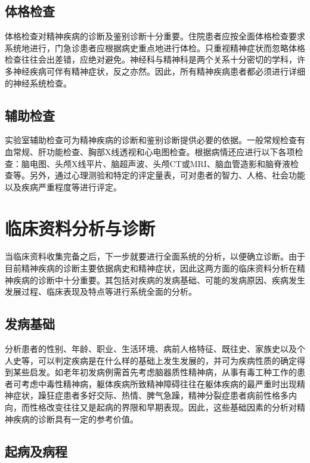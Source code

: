 \subsection{体格检查}

体格检查对精神疾病的诊断及鉴别诊断十分重要。住院患者应按全面体格检查要求系统地进行，门急诊患者应根据病史重点地进行体检。只重视精神症状而忽略体格检查往往会出差错，应绝对避免。神经科与精神科是两个关系十分密切的学科，许多神经疾病可伴有精神症状，反之亦然。因此，所有精神疾病患者都必须进行详细的神经系统检查。

\subsection{辅助检查}

实验室辅助检查可为精神疾病的诊断和鉴别诊断提供必要的依据。一般常规检查有血常规、肝功能检查、胸部X线透视和心电图检查。根据病情还应进行以下各项检查：脑电图、头颅X线平片、脑超声波、头颅CT或MRI、脑血管造影和脑脊液检查等。另外，通过心理测验和特定的评定量表，可对患者的智力、人格、社会功能以及疾病严重程度等进行评定。

\section{临床资料分析与诊断}

当临床资料收集完备之后，下一步就要进行全面系统的分析，以便确立诊断。由于目前精神疾病的诊断主要依据病史和精神症状，因此这两方面的临床资料分析在精神疾病的诊断中十分重要。其包括对疾病的发病基础、可能的发病原因、疾病发生发展过程、临床表现及特点等进行系统全面的分析。

\subsection{发病基础}

分析患者的性别、年龄、职业、生活环境、病前人格特征、既往史、家族史以及个人史等，可以判定疾病是在什么样的基础上发生发展的，并可为疾病性质的确定得到某些启发。如老年初发病例需首先考虑脑器质性精神病，从事有毒工种工作的患者可考虑中毒性精神病，躯体疾病所致精神障碍往往在躯体疾病的最严重时出现精神症状，躁狂症患者多好交际、热情、脾气急躁，精神分裂症患者病前性格多内向，而性格改变往往又是起病的界限和早期表现。因此，这些基础因素的分析对精神疾病的诊断具有一定的参考价值。

\subsection{起病及病程}

